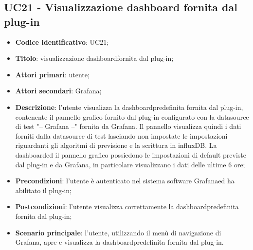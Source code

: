 \subsection{UC21 - Visualizzazione dashboard fornita dal plug-in}
\begin{itemize}
	\item \textbf{Codice identificativo}: UC21;
	\item \textbf{Titolo}: visualizzazione dashboard\glosp fornita dal plug-in;
	\item \textbf{Attori primari}: utente;
	\item \textbf{Attori secondari}: Grafana\glo;
	\item \textbf{Descrizione}: l'utente visualizza la dashboard\glosp predefinita fornita dal plug-in, contenente il pannello grafico fornito dal plug-in configurato con la datasource di test "-- Grafana --" fornita da Grafana\glo. Il pannello visualizza quindi i dati forniti dalla datasource di test lasciando non impostate le impostazioni riguardanti gli algoritmi di previsione e la scrittura in influxDB. La dashboard\glosp ed il pannello grafico possiedono le impostazioni di default previste dal plug-in e da Grafana\glo, in particolare visualizzano i dati delle ultime 6 ore;
	\item \textbf{Precondizioni}: l'utente è autenticato nel sistema software Grafana\glosp ed ha abilitato il plug-in;
	\item \textbf{Postcondizioni}: l'utente visualizza correttamente la dashboard\glosp predefinita fornita dal plug-in;
	\item \textbf{Scenario principale}: l'utente, utilizzando il menù di navigazione di Grafana\glo, apre e visualizza la dashboard\glosp predefinita fornita dal plug-in.
\end{itemize} 
